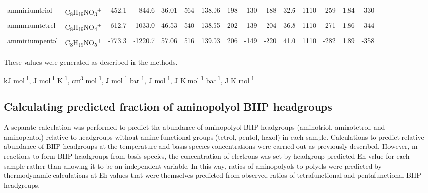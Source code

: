 {\begin{landscape}
\begin{table}
\begin{adjustbox}{width=600pt,keepaspectratio}
\begin{threeparttable}
\begin{tabular}{llrrrrrrrrrrrrr}
amminiumtriol & C\textsubscript{8}H\textsubscript{19}NO\textsubscript{3}\textsuperscript{+} & -452.1 & -844.6 & 36.01 & 564   & 138.06 & 198   & -130  & -188  & 32.6  & 1110  & -259  & 1.84  & -330 \\
amminiumtetrol & C\textsubscript{8}H\textsubscript{19}NO\textsubscript{4}\textsuperscript{+} & -612.7 & -1033.0 & 46.53 & 540   & 138.55 & 202   & -139  & -204  & 36.8  & 1110  & -271  & 1.86  & -344 \\
amminiumpentol & C\textsubscript{8}H\textsubscript{19}NO\textsubscript{5}\textsuperscript{+} & -773.3 & -1220.7 & 57.06 & 516   & 139.03 & 206   & -149  & -220  & 41.0  & 1110  & -282  & 1.89  & -358 \\
\bottomrule
\end{tabular}%


  \begin{tablenotes}
    These values were generated as described in the methods.
    
     kJ mol\textsuperscript{-1},
     J mol\textsuperscript{-1} K\textsuperscript{-1},
     cm\textsuperscript{3} mol\textsuperscript{-1},
     J mol\textsuperscript{-1} bar\textsuperscript{-1},
     J mol\textsuperscript{-1},
     J K mol\textsuperscript{-1} bar\textsuperscript{-1},
     J K mol\textsuperscript{-1}


  \end{tablenotes}
  
  \label{tab:BHP_thermo_props}
  \end{threeparttable}
  \end{adjustbox}
\end{table}
\doublespace
\end{landscape}
\setcounter{tabcounter}{0} %
\clearpage
}

\subsection{Calculating predicted fraction of aminopolyol BHP headgroups}

A separate calculation was performed to predict the abundance of aminopolyol BHP headgroups (aminotriol, aminotetrol, and aminopentol) relative to headgroups without amine functional groups (tetrol, pentol, hexol) in each sample. Calculations to predict relative abundance of BHP headgroups at the temperature and basis species concentrations were carried out as previously described. However, in reactions to form BHP headgroups from basis species, the concentration of electrons was set by headgroup-predicted Eh value for each sample rather than allowing it to be an independent variable. In this way, ratios of aminopolyols to polyols were predicted by thermodynamic calculations at Eh values that were themselves predicted from observed ratios of tetrafunctional and pentafunctional BHP headgroups.


